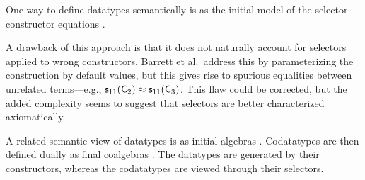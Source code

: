 %
%

One way to define datatypes semantically is as the initial model of the
selector--constructor equations \cite{barrett-et-al-2010}.
\begin{report}
A drawback of this approach is that it does
not naturally account for selectors applied to wrong constructors. Barrett et
al.\ address this by parameterizing the construction by default values, but
this gives rise to spurious equalities between unrelated terms---e.g.,
$\textsf{s}_{11}(\textsf{C}_2) \approx \textsf{s}_{11}(\textsf{C}_3)$. This flaw
could be corrected, but the added complexity seems to suggest that selectors
are better characterized axiomatically.

\end{report}
A related semantic view of datatypes is as initial algebras \cite{xxx}.
Codatatypes are then defined dually as final coalgebras \cite{xxx}. The
datatypes are generated by their constructors, whereas the codatatypes are
viewed through their selectors.

